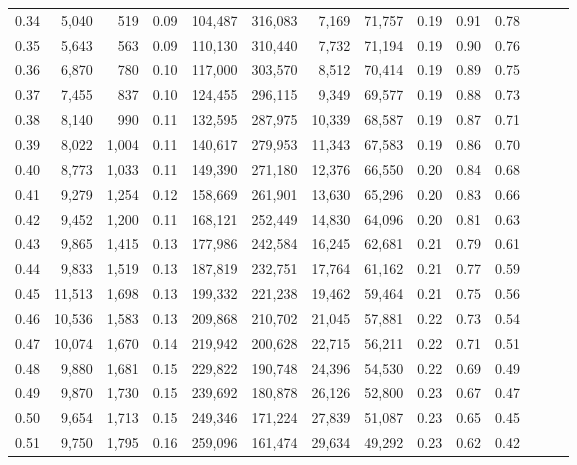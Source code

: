 \begin{tabular}{rrrrrrrrrrrrrr}
0.34 &   5,040 &    519 &  0.09 &  104,487 &  316,083 &   7,169 &  71,757 &  0.19 &  0.91 &      0.78 \\
0.35 &   5,643 &    563 &  0.09 &  110,130 &  310,440 &   7,732 &  71,194 &  0.19 &  0.90 &      0.76 \\
0.36 &   6,870 &    780 &  0.10 &  117,000 &  303,570 &   8,512 &  70,414 &  0.19 &  0.89 &      0.75 \\
0.37 &   7,455 &    837 &  0.10 &  124,455 &  296,115 &   9,349 &  69,577 &  0.19 &  0.88 &      0.73 \\
0.38 &   8,140 &    990 &  0.11 &  132,595 &  287,975 &  10,339 &  68,587 &  0.19 &  0.87 &      0.71 \\
0.39 &   8,022 &  1,004 &  0.11 &  140,617 &  279,953 &  11,343 &  67,583 &  0.19 &  0.86 &      0.70 \\
0.40 &   8,773 &  1,033 &  0.11 &  149,390 &  271,180 &  12,376 &  66,550 &  0.20 &  0.84 &      0.68 \\
0.41 &   9,279 &  1,254 &  0.12 &  158,669 &  261,901 &  13,630 &  65,296 &  0.20 &  0.83 &      0.66 \\
0.42 &   9,452 &  1,200 &  0.11 &  168,121 &  252,449 &  14,830 &  64,096 &  0.20 &  0.81 &      0.63 \\
0.43 &   9,865 &  1,415 &  0.13 &  177,986 &  242,584 &  16,245 &  62,681 &  0.21 &  0.79 &      0.61 \\
0.44 &   9,833 &  1,519 &  0.13 &  187,819 &  232,751 &  17,764 &  61,162 &  0.21 &  0.77 &      0.59 \\
0.45 &  11,513 &  1,698 &  0.13 &  199,332 &  221,238 &  19,462 &  59,464 &  0.21 &  0.75 &      0.56 \\
0.46 &  10,536 &  1,583 &  0.13 &  209,868 &  210,702 &  21,045 &  57,881 &  0.22 &  0.73 &      0.54 \\
0.47 &  10,074 &  1,670 &  0.14 &  219,942 &  200,628 &  22,715 &  56,211 &  0.22 &  0.71 &      0.51 \\
0.48 &   9,880 &  1,681 &  0.15 &  229,822 &  190,748 &  24,396 &  54,530 &  0.22 &  0.69 &      0.49 \\
0.49 &   9,870 &  1,730 &  0.15 &  239,692 &  180,878 &  26,126 &  52,800 &  0.23 &  0.67 &      0.47 \\
0.50 &   9,654 &  1,713 &  0.15 &  249,346 &  171,224 &  27,839 &  51,087 &  0.23 &  0.65 &      0.45 \\
0.51 &   9,750 &  1,795 &  0.16 &  259,096 &  161,474 &  29,634 &  49,292 &  0.23 &  0.62 &      0.42 \\

\end{tabular}
